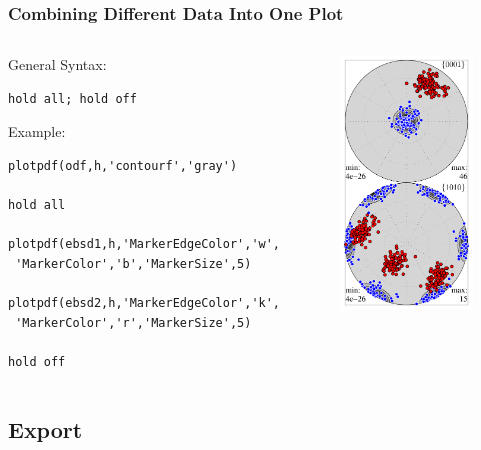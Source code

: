 \begin{frame}[fragile]
  \frametitle{Combining Different Data Into One Plot}

  \begin{columns}
    \begin{column}{8.7cm}

      General Syntax:%
\begin{lstlisting}
hold all; hold off
\end{lstlisting}

    Example:
\begin{lstlisting}
plotpdf(odf,h,'contourf','gray')

hold all

plotpdf(ebsd1,h,'MarkerEdgeColor','w',
 'MarkerColor','b','MarkerSize',5)

plotpdf(ebsd2,h,'MarkerEdgeColor','k',
 'MarkerColor','r','MarkerSize',5)

hold off
\end{lstlisting}


    \end{column}

    \begin{column}{3.5cm}
      \includegraphics[width=3.5cm]{pic/combined}%
    \end{column}
  \end{columns}

\end{frame}

\subsection*{Export}

